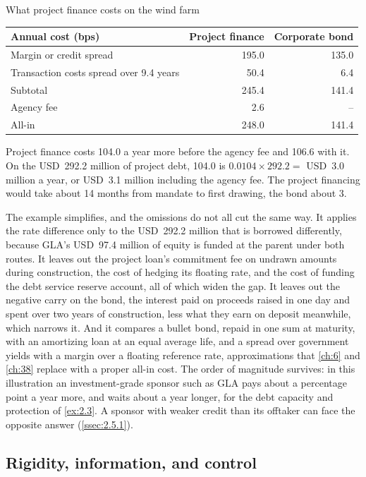\begin{example}{What project finance costs on the wind farm \illustrative}
\begin{center}
\begin{tabularx}{\linewidth}{@{}L rr@{}}
\toprule
Annual cost (bps) & Project finance & Corporate bond\\
\midrule
Margin or credit spread & 195.0 & 135.0\\
Transaction costs spread over 9.4 years & 50.4 & 6.4\\
\midrule
Subtotal & 245.4 & 141.4\\
Agency fee & 2.6 & --\\
\midrule
All-in & 248.0 & 141.4\\
\bottomrule
\end{tabularx}
\end{center}

Project finance costs 104.0\bps{} a year more before the agency fee and 106.6\bps{} with it. On the USD~292.2 million of project debt, 104.0\bps{} is $0.0104 \times 292.2 = $ USD~3.0 million a year, or USD~3.1 million including the agency fee. The project financing would take about 14 months from mandate to first drawing, the bond about 3.
\end{example}

The example simplifies, and the omissions do not all cut the same way. It applies the rate difference only to the USD~292.2 million that is borrowed differently, because GLA's USD~97.4 million of equity is funded at the parent under both routes. It leaves out the project loan's commitment fee on undrawn amounts during construction, the cost of hedging its floating rate, and the cost of funding the debt service reserve account, all of which widen the gap. It leaves out the negative carry on the bond, the interest paid on proceeds raised in one day and spent over two years of construction, less what they earn on deposit meanwhile, which narrows it. And it compares a bullet bond, repaid in one sum at maturity, with an amortizing loan at an equal average life, and a spread over government yields with a margin over a floating reference rate, approximations that \cref{ch:6} and \cref{ch:38} replace with a proper all-in cost. The order of magnitude survives: in this illustration an investment-grade sponsor such as GLA pays about a percentage point a year more, and waits about a year longer, for the debt capacity and protection of \cref{ex:2.3}. A sponsor with weaker credit than its offtaker can face the opposite answer (\cref{ssec:2.5.1}).

\subsection{Rigidity, information, and control}\label{ssec:2.6.2}

